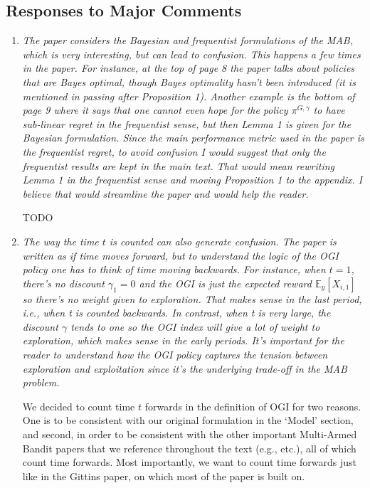 \documentclass[11pt]{article}
\newcommand{\1}{\ensuremath{\mathbf{1}}} %
\theoremstyle{thm-sf}
\begin{document}
	\subsection{Responses to Major Comments}
	
	\begin{enumerate}
		\item {\it The paper considers the Bayesian and frequentist formulations of the MAB, which is very interesting, but can lead to confusion. This happens a few times in the paper. For instance, at the top of page 8 the paper talks about policies that are Bayes optimal, though Bayes optimality hasn't been introduced (it is mentioned in passing after Proposition 1). Another example is the bottom of page 9 where it says that one cannot even hope for the policy $\pi^{G,\gamma}$ to have sub-linear regret in the frequentist sense, but then Lemma 1 is given for the Bayesian formulation. Since the main performance metric used in the paper is the frequentist regret, to avoid confusion I would suggest that only the frequentist results are kept in the main text. That would mean rewriting Lemma 1 in the frequentist sense and moving Proposition 1 to the appendix. I believe that would streamline the paper and would help the reader.}
		
		TODO
		
		\item {\it The way the time $t$ is counted can also generate confusion. The paper is written as if time moves forward, but to understand the logic of the OGI policy one has to think of time moving backwards. For instance, when $t = 1$, there's no discount $\gamma_1 = 0$ and the OGI is just the expected reward $\mathbb E_y [X_{i,1}]$ so there's no weight given to exploration. That makes sense in the last period, i.e., when t is counted backwards. In contrast, when t is very large, the discount $\gamma$ tends to one so the OGI index will give a lot of weight to exploration, which makes sense in the early periods. It's important for the reader to understand how the OGI policy captures the tension between exploration and exploitation since it's the underlying trade-off in the MAB problem.
		}
	
		We decided to count time $t$ forwards in the definition of OGI for two reasons. One is to be consistent with our original formulation in the `Model' section, and second, in order to be consistent with the other important Multi-Armed Bandit papers that we reference throughout the text (e.g., \cite{lai1985asymptotically,auer2002finite,gittins1979bandit} etc.), all of which count time forwards. Most importantly, we want to count time forwards just like in the Gittins paper, on which most of the paper is built on.
	

\end{enumerate}
\end{document}
